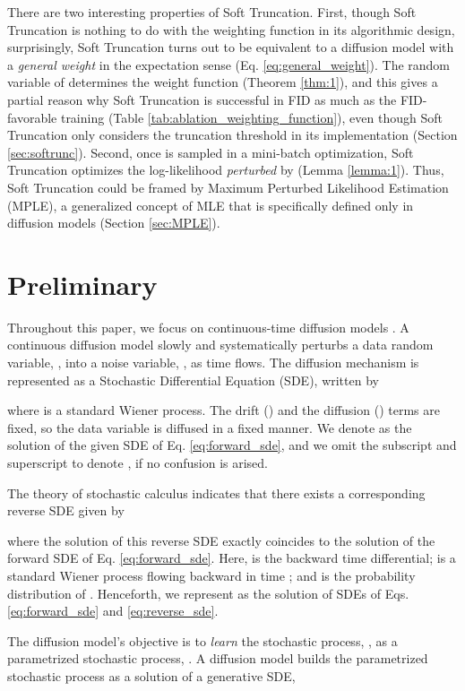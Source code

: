 \documentclass[nohyperref]{article}
\theoremstyle{plain}
\theoremstyle{definition}
\theoremstyle{remark}
\begin{document}
There are two interesting properties of Soft Truncation. First, though Soft Truncation is nothing to do with the weighting function in its algorithmic design, surprisingly, Soft Truncation turns out to be equivalent to a diffusion model with a \textit{general weight} in the expectation sense (Eq. \eqref{eq:general_weight}). The random variable of  determines the weight function (Theorem \ref{thm:1}), and this gives a partial reason why Soft Truncation is successful in FID as much as the FID-favorable training (Table \ref{tab:ablation_weighting_function}), even though Soft Truncation only considers the truncation threshold in its implementation (Section \ref{sec:softrunc}). Second, once  is sampled in a mini-batch optimization, Soft Truncation optimizes the log-likelihood \textit{perturbed} by  (Lemma \ref{lemma:1}). Thus, Soft Truncation could be framed by Maximum Perturbed Likelihood Estimation (MPLE), a generalized concept of MLE that is specifically defined only in diffusion models (Section \ref{sec:MPLE}). 

\section{Preliminary}\label{sec:preliminary}

Throughout this paper, we focus on continuous-time diffusion models \cite{song2020score}. A continuous diffusion model slowly and systematically perturbs a data random variable, , into a noise variable, , as time flows. The diffusion mechanism is represented as a Stochastic Differential Equation (SDE), written by

where  is a standard Wiener process. The drift () and the diffusion () terms are fixed, so the data variable is diffused in a fixed manner. We denote  as the solution of the given SDE of Eq. \eqref{eq:forward_sde}, and we omit the subscript and superscript to denote , if no confusion is arised.

The theory of stochastic calculus indicates that there exists a corresponding reverse SDE given by

where the solution of this reverse SDE exactly coincides to the solution of the forward SDE of Eq. \eqref{eq:forward_sde}. Here,  is the backward time differential;  is a standard Wiener process flowing backward in time \cite{anderson1982reverse}; and  is the probability distribution of . Henceforth, we represent  as the solution of SDEs of Eqs. \eqref{eq:forward_sde} and \eqref{eq:reverse_sde}.

The diffusion model's objective is to \textit{learn} the stochastic process, , as a parametrized stochastic process, . A diffusion model builds the parametrized stochastic process as a solution of a generative SDE,
\end{document}
